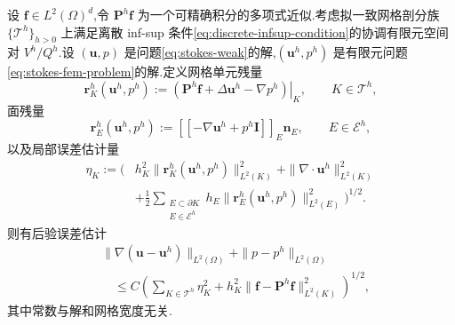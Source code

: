 \begin{theorem}\label{thm:stokes-residual-global-upper-estimate}
设 $\bm{f}\in L^2(\Omega)^d$,令 $\bm{P}^h\bm{f}$ 为一个可精确积分的多项式近似.考虑拟一致网格剖分族 $\{\mathcal{T}^h\}_{h>0}$ 上满足离散 inf-sup 条件\cref{eq:discrete-infsup-condition}的协调有限元空间对 $V^h/Q^h$.设 $(\bm{u},p)$ 是问题\cref{eq:stokes-weak}的解,$(\bm{u}^h,p^h)$ 是有限元问题\cref{eq:stokes-fem-problem}的解.定义网格单元残量
\begin{equation}\label{eq:stokes-residual-cell-residual}
  \bm{r}_K^h(\bm{u}^h,p^h)
  :=\left.\left(\bm{P}^h\bm{f}
       +\Delta\bm{u}^h-\nabla p^h\right)\right|_K,
  \qquad K\in\mathcal{T}^h,
\end{equation}
面残量
\begin{equation}\label{eq:stokes-residual-face-residual}
  \bm{r}_E^h(\bm{u}^h,p^h)
  :=\left[\!\left[-\nabla\bm{u}^h+p^h\bm{I}\right]\!\right]_E
       \bm{n}_E,
  \qquad E\in\mathcal{E}^h,
\end{equation}
以及局部误差估计量
\begin{equation}\label{eq:stokes-residual-local-estimator}
\begin{aligned}
  \eta_K:=\Biggl(&h_K^2
       \|\bm{r}_K^h(\bm{u}^h,p^h)\|_{L^2(K)}^2
       +\|\nabla\cdot\bm{u}^h\|_{L^2(K)}^2\\
       &+\frac12\sum_{\substack{E\subset\partial K\\E\in\mathcal{E}^h}}
       h_E\|\bm{r}_E^h(\bm{u}^h,p^h)\|_{L^2(E)}^2\Biggr)^{1/2}.
\end{aligned}
\end{equation}
则有后验误差估计
\begin{equation}\label{eq:stokes-residual-global-error-estimate}
\begin{aligned}
 &\|\nabla(\bm{u}-\bm{u}^h)\|_{L^2(\Omega)}
       +\|p-p^h\|_{L^2(\Omega)}\\
 &\quad\leq C\left(\sum_{K\in\mathcal{T}^h}
       \eta_K^2+h_K^2\|\bm{f}-\bm{P}^h\bm{f}\|_{L^2(K)}^2
       \right)^{1/2},
\end{aligned}
\end{equation}
其中常数与解和网格宽度无关.
\end{theorem}
